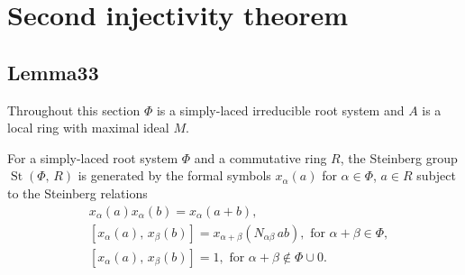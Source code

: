\documentclass[oneside, 8pt]{amsart}
\theoremstyle{remark}
\theoremstyle{definition}
\DeclareMathOperator{\St}{St}
\numberwithin{equation}{section}
\begin{document}
\section{Second injectivity theorem}
\begin{comment} 
First of all, set $\widetilde{V} = \overline{G}^{\geq 0}_M \times G^{\leq 0} \times (1 + M)^*$
 and consider it as a pointed set, i.\,e. ignore its structure of the group but retain $\widetilde{v_0} = (1, 1, 1)$ as a choice of a basepoint.
We let the group $\St(\Phi, R, M)$ act on $\widetilde{V}$ via the formula 
 $h \cdot (\overline{g}^+, g^-, u) = (\overline{g}^+ \cdot j_+i_+(h), i_-(h)^{-1}\cdot g^-, u)$.
Denote by $V$ the set of orbits of this action with the fixed basepoint $v_0 = O(\widetilde{v}_0)$.
We will use the notation $[\overline{g}^+, g^-, u]$ as a shorthand for $O(\overline{g}^+, g^-, u)$.

It is obvious that the map $\widetilde{p} \colon \widetilde{V} \to \St(\Phi, R[t, t^{-1}])$ given by 
 \[(\overline{g}^+, g^-, u) \mapsto \overline{g}^+ \cdot j_-(g^-) \cdot \{t, u\}\]
 is constant on the orbits of the above action
  and therefore gives rise to a well-defined map $p \colon V \to \St(\Phi, R[t, t^{-1}])$ of pointed sets.

We will construct an action of $\St(\Phi, B)$ on the set $V$ with the following additional properties:
\begin{enumerate}
\item for $g^- \in \St(\Phi, R[t^{-1}])$ one has $\varphi(g^-) \cdot v_0 = [1, g^-, 1]$, where $\varphi$ is the canonical map
  $\St(\Phi, R[t^{-1}]) \to \St(\Phi, B)$ induced by the embedding $R[t^{-1}] \to B$.
\item for $g \in \St(\Phi, B)$ the element $p(g \cdot v_0)$ coincides with the canonical image of $g$ in $\St(\Phi, R[t, t^{-1}])$; 
\end{enumerate} \end{comment}

\subsection{Lemma33}
Throughout this section $\Phi$ is a simply-laced irreducible root system and $A$ is a local ring with maximal ideal $M$.

For a simply-laced root system $\Phi$ and a commutative ring $R$, the Steinberg group $\St(\Phi,\,R)$ is generated by the formal symbols $x_{\alpha}(a)$ for $\alpha\in\Phi$, $a\in R$ subject to the Steinberg relations
\setcounter{equation}{0}
\renewcommand{\theequation}{R\arabic{equation}}
\begin{align}
&x_{\alpha}(a)x_{\alpha}(b)=x_{\alpha}(a+b),\\
&[x_{\alpha}(a),\,x_{\beta}(b)]=x_{\alpha+\beta}(N_{\alpha\beta}\,ab),\text{ for }\alpha+\beta\in\Phi,\\
&[x_{\alpha}(a),\,x_{\beta}(b)]=1,\text{ for }\alpha+\beta\not\in\Phi\cup0.
\end{align}
\end{document}
